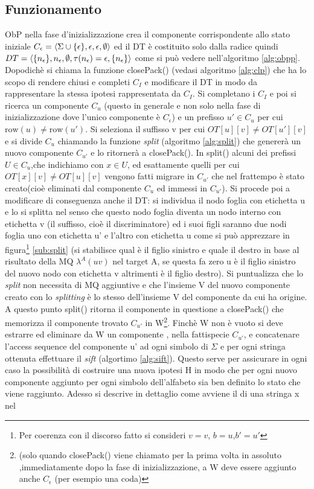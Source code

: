 \subsection{Funzionamento}
\label{sub:fun}
\ac{ObP} nella fase d'inizializzazione crea il componente corrispondente allo stato iniziale $C_{\epsilon} = \Braket{\Sigma \cup \{\epsilon\},\epsilon,\epsilon,\emptyset}$ ed il \ac{DT} è costituito solo dalla radice quindi $DT = \Braket{\{n_{\epsilon}\},n_{\epsilon},\emptyset,\tau(n_{\epsilon})=\epsilon,\{n_{\epsilon}\}}$ come si può vedere nell'algoritmo \ref{alg:obpp}. Dopodichè si chiama la funzione closePack() (vedasi algoritmo \ref{alg:clp}) che ha lo scopo di rendere chiusi e completi $C_{I}$ e modificare il \ac{DT} in modo da rappresentare la stessa ipotesi rappresentata da $C_{I}$. Si completano i $C_{I}$ e poi si ricerca un componente $C_{u}$ (questo in generale e non solo nella fase di inizializzazione dove l'unico componente è $C_{\epsilon}$) e un prefisso $u' \in C_{u}$ per cui $\text{row}(u) \neq \text{row}(u')$. Si seleziona il suffisso v per cui $OT[u][v] \neq OT[u'][v]$ e si divide $C_u$ chiamando la funzione \textit{split} (algoritmo \ref{alg:split}) che genererà un nuovo componente $C_{u'}$ e lo ritornerà a closePack(). In split() alcuni dei prefissi $U \in C_{u}$,che indichiamo con $x \in U$, ed esattamente quelli per cui $OT[x][v] \neq OT[u][v]$ vengono fatti migrare in $C_{u'}$ che nel frattempo è stato creato(cioè eliminati dal componente $C_{u}$ ed immessi in $C_{u'}$). Si procede poi a modificare di conseguenza anche il \ac{DT}: si individua il nodo foglia con etichetta u e lo si splitta nel senso che questo nodo foglia diventa un nodo interno con etichetta v (il suffisso, cioè il discriminatore) ed i suoi figli saranno due nodi foglia uno con etichetta u' e l'altro con etichetta u come si può apprezzare in figura\footnote{Per coerenza con il discorso fatto si consideri $v=v$, $b=u$,$b'=u'$} \ref{sub:split} (si stabilisce qual è il figlio sinistro e quale il destro in base al risultato della \ac{MQ} $\lambda^{A}(uv)$ nel target A, se questa fa zero u è il figlio sinistro del nuovo nodo con etichetta v altrimenti è il figlio destro). Si puntualizza che lo \textit{split} non necessita di \ac{MQ} aggiuntive e che l'insieme V del nuovo componente creato con lo \textit{splitting} è lo stesso dell'insieme V del componente da cui ha origine. A questo punto split() ritorna il componente in questione a closePack() che memorizza il componente trovato $C_{u'}$ in W\footnote{ (solo quando closePack() viene chiamato per la prima volta in assoluto ,immediatamente dopo la fase di inizializzazione, a W deve essere aggiunto anche $C_{\epsilon}$ (per esempio una coda)}. Finchè W non è vuoto si deve estrarre ed eliminare da W un componente , nella fattispecie $C_{u'}$, e concatenare l'access sequence del componente u' ad ogni simbolo di $\Sigma$ e per ogni stringa ottenuta effettuare il \textit{sift} (algortimo \ref{alg:sift}). Questo serve per assicurare in ogni caso la possibilità di costruire una nuova ipotesi \ac{H} in modo che per ogni nuovo componente aggiunto per ogni simbolo dell'alfabeto sia ben definito lo stato che viene raggiunto. Adesso si descrive in dettaglio come avviene il  di una stringa x nel 